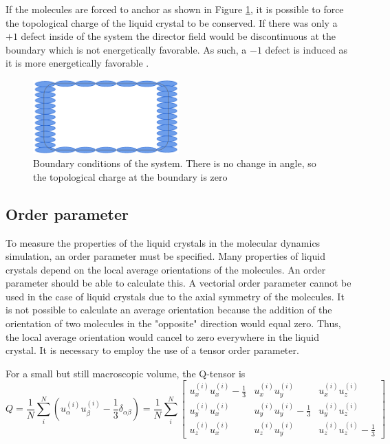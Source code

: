 \documentclass[preprint, aps]{revtex4-1}
\begin{document}
If the molecules are forced to anchor as shown in Figure \ref{fig:bc}, it is 
possible to force the topological charge of the liquid crystal to be conserved. 
If there was only a $+1$ defect inside of the system the director field would be
discontinuous at the boundary which is not energetically favorable. As such, a
$-1$ defect is induced as it is more energetically favorable \cite{stark01}.
	\begin{figure}[H]
		\centering
		\includegraphics[width=0.5\textwidth]{bc.png}
		\caption{Boundary conditions of the system. There is no change in angle,
		so the topological charge at the boundary is zero}
		\label{fig:bc}
	\end{figure}

\subsection*{Order parameter}
To measure the properties of the liquid crystals in the molecular dynamics 
simulation, an order parameter must be specified. Many properties of liquid
crystals depend on the local average orientations of the molecules. An order
parameter should be able to calculate this. A vectorial order parameter cannot 
be used in the case of liquid crystals due to the axial symmetry of the 
molecules. It is not possible to calculate an average orientation because the 
addition of the orientation of two molecules in the "opposite" direction would 
equal zero. Thus, the local average orientation would cancel to zero
everywhere in the liquid crystal. It is necessary to employ the use of a tensor 
order parameter. 

For a small but still macroscopic volume, the Q-tensor is
	\begin{equation} \label{q-tensor}
		Q = \frac{1}{N} \sum_{i}^{N} 
		(u_{\alpha}^{(i)} u_{\beta}^{(i)} - \frac{1}{3}\delta_{\alpha\beta})
		= \frac{1}{N} \sum_{i}^{N}
		\begin{bmatrix}
			u_x^{(i)}u_x^{(i)} - \frac{1}{3} 
			& u_x^{(i)}u_y^{(i)} 
			& u_x^{(i)}u_z^{(i)} \\

			u_y^{(i)}u_x^{(i)} 
			& u_y^{(i)}u_y^{(i)} - \frac{1}{3} 
			& u_y^{(i)}u_z^{(i)} \\

			u_z^{(i)}u_x^{(i)} 
			& u_z^{(i)}u_y^{(i)} 
			& u_z^{(i)}u_z^{(i)} - \frac{1}{3}
		\end{bmatrix}
	\end{equation}
\end{document}
